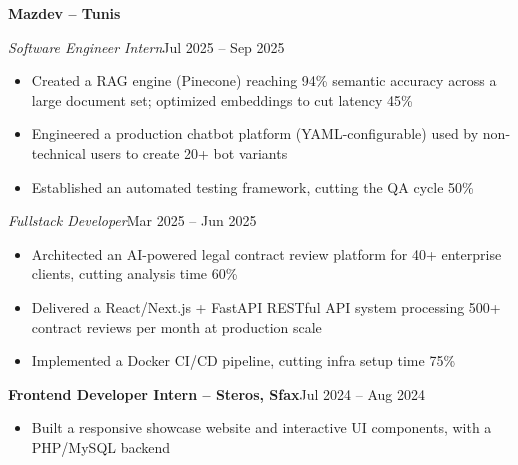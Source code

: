 \documentclass[10pt,a4paper]{article}
\newcommand{\entry}[2]{\vspace{1pt}\noindent\textbf{#1}\hfill{\color{muted}#2}\par}
\newcommand{\subentry}[2]{\noindent\textit{#1}\hfill{\color{muted}#2}\par}
\begin{document}
\entry{Mazdev -- Tunis}{}
\subentry{Software Engineer Intern}{Jul 2025 -- Sep 2025}
\begin{itemize}
  \item Created a RAG engine (Pinecone) reaching 94\% semantic accuracy across a large document set; optimized embeddings to cut latency 45\%
  \item Engineered a production chatbot platform (YAML-configurable) used by non-technical users to create 20+ bot variants
  \item Established an automated testing framework, cutting the QA cycle 50\%
\end{itemize}
\subentry{Fullstack Developer}{Mar 2025 -- Jun 2025}
\begin{itemize}
  \item Architected an AI-powered legal contract review platform for 40+ enterprise clients, cutting analysis time 60\%
  \item Delivered a React/Next.js + FastAPI RESTful API system processing 500+ contract reviews per month at production scale
  \item Implemented a Docker CI/CD pipeline, cutting infra setup time 75\%
\end{itemize}

\entry{Frontend Developer Intern -- Steros, Sfax}{Jul 2024 -- Aug 2024}
\begin{itemize}
  \item Built a responsive showcase website and interactive UI components, with a PHP/MySQL backend
\end{itemize}
\end{document}
